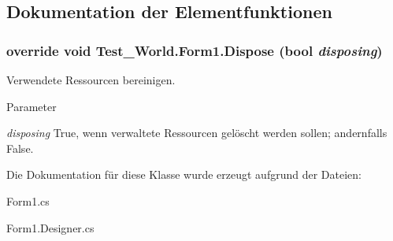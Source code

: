 \subsection{Dokumentation der Elementfunktionen}
\hypertarget{class_test___world_1_1_form1_a76e28105467035fd345da22985304e4b}{
\subsubsection[{Dispose}]{\setlength{\rightskip}{0pt plus 5cm}override void Test\_\-World.Form1.Dispose (bool {\em disposing})}}
\label{class_test___world_1_1_form1_a76e28105467035fd345da22985304e4b}


Verwendete Ressourcen bereinigen. 


\begin{DoxyParams}{Parameter}
\item[{\em disposing}]True, wenn verwaltete Ressourcen gelöscht werden sollen; andernfalls False.\end{DoxyParams}


Die Dokumentation für diese Klasse wurde erzeugt aufgrund der Dateien:\begin{DoxyCompactItemize}
\item 
Form1.cs\item 
Form1.Designer.cs\end{DoxyCompactItemize}
